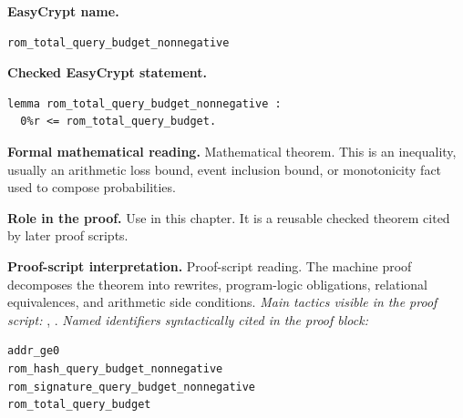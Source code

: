 \begin{formaltheorem}
\noindent\textbf{EasyCrypt name.}
\begin{lstlisting}[language=EasyCrypt,basicstyle=\ttfamily\scriptsize]
rom_total_query_budget_nonnegative
\end{lstlisting}
\noindent\textbf{Checked EasyCrypt statement.}
\begin{lstlisting}[language=EasyCrypt,basicstyle=\ttfamily\scriptsize]
lemma rom_total_query_budget_nonnegative :
  0%r <= rom_total_query_budget.
\end{lstlisting}
\noindent\textbf{Formal mathematical reading.}
Mathematical theorem. This is an inequality, usually an arithmetic loss bound, event inclusion bound, or monotonicity fact used to compose probabilities.

\noindent\textbf{Role in the proof.}
Use in this chapter. It is a reusable checked theorem cited by later proof scripts.

\noindent\textbf{Proof-script interpretation.}
Proof-script reading. The machine proof decomposes the theorem into rewrites, program-logic obligations, relational equivalences, and arithmetic side conditions.
\emph{Main tactics visible in the proof script:} , .
\emph{Named identifiers syntactically cited in the proof block:}
\begin{lstlisting}[language=EasyCrypt,basicstyle=\ttfamily\scriptsize]
addr_ge0
rom_hash_query_budget_nonnegative
rom_signature_query_budget_nonnegative
rom_total_query_budget
\end{lstlisting}

\end{formaltheorem}

